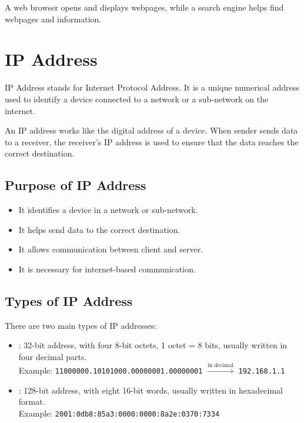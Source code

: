 \begin{summarybox}
A web browser opens and displays webpages, while a search engine helps find webpages and information.
\end{summarybox}

\section{IP Address}

\begin{definitionbox}[IP Address]
IP Address stands for Internet Protocol Address. It is a unique numerical address used to identify a device connected to a network or a sub-network on the internet.
\end{definitionbox}

\Note An IP address works like the digital address of a device. When sender sends data to a receiver, the receiver's IP address is used to ensure that the data reaches the correct destination.

\subsection{Purpose of IP Address}

\begin{itemize}
    \item It identifies a device in a network or sub-network.
    \item It helps send data to the correct destination.
    \item It allows communication between client and server.
    \item It is necessary for internet-based communication.
\end{itemize}

\subsection{Types of IP Address}

There are two main types of IP addresses:
\begin{itemize}
    \item {}: 32-bit address, with four 8-bit octets, 1 octet = 8 bits, usually written in four decimal parts.\\
          Example:  \texttt{11000000.10101000.00000001.00000001} $\xrightarrow{\text{in decimal}}$ \texttt{192.168.1.1}
    \item {}: 128-bit address, with eight 16-bit words, usually written in hexadecimal format.\\
          Example: \texttt{2001:0db8:85a3:0000:0000:8a2e:0370:7334}
\end{itemize}

